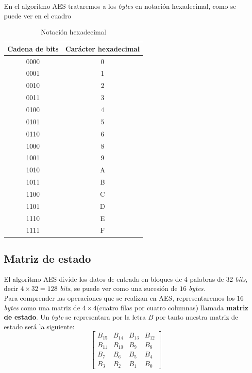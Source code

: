 \documentclass[peerreview]{IEEEtran}
\begin{document}
En el algoritmo AES trataremos a los \textit{bytes} en notación hexadecimal, como se puede ver en el cuadro 
\begin{table}[ht]
\centering
\begin{tabular}{|c|c|}
\hline
\textbf{Cadena de bits} & \textbf{Carácter hexadecimal} \\ \hline
0000                    & 0                             \\ \hline
0001                    & 1                             \\ \hline
0010                    & 2                             \\ \hline
0011                    & 3                             \\ \hline
0100                    & 4                             \\ \hline
0101                    & 5                             \\ \hline
0110                    & 6                             \\ \hline
1000                    & 8                             \\ \hline
1001                    & 9                             \\ \hline
1010                    & A                             \\ \hline
1011                    & B                             \\ \hline
1100                    & C                             \\ \hline
1101                    & D                             \\ \hline
1110                    & E                             \\ \hline
1111                    & F                             \\ \hline
\end{tabular}
\caption{Notación hexadecimal}
\label{tab:HEX}
\end{table}
\subsection{Matriz de estado}
El algoritmo AES divide los datos de entrada en bloques de $4$ palabras de $32$ \textit{bits}, decir $4 \times 32 = 128$ \textit{bits}, se puede ver como una sucesión de $16$ \textit{bytes}.\\

Para comprender las operaciones que se realizan en AES, representaremos los $16$ \textit{bytes} como una matriz de $4\times 4$(cuatro filas por cuatro columnas) llamada \textbf{matriz de estado}. Un \textit{byte} se representara por la letra $B$ por tanto nuestra matriz de estado será la siguiente:
$$ \begin{bmatrix}
B_{15} & B_{14} & B_{13} & B_{12} \\
B_{11} & B_{10} & B_9 & B_8 \\
B_7 & B_6 & B_5 & B_4 \\
B_3 & B_2 & B_1 & B_0 
\end{bmatrix}  $$
\end{document}
